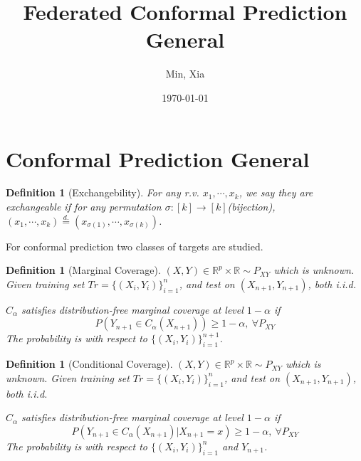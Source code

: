 \documentclass[12pt, a4paper, oneside]{article}
\title{\textbf{Federated Conformal Prediction General}}
\author{Min, Xia}
\date{\today}
\newtheorem{definition}[theorem]{Definition}
\begin{document}
\maketitle
\setcounter{page}{1}
\section[Section title sans citation]{Conformal Prediction General\cite{angelopoulos2023conformal}}
    \begin{definition}[Exchangebility]\cite{shafer2008tutorial}
        For any r.v. $x_1,\cdots,x_k$, we say they are exchangeable if for any permutation $\sigma:[k]\rightarrow[k]$(bijection), $(x_1,\cdots,x_k)\overset{d.}{=}(x_{\sigma(1)},\cdots,x_{\sigma(k)})$.
    \end{definition}


    For conformal prediction two classes of targets are studied.
    \begin{definition}[Marginal Coverage]
        $(X,Y)\in\mathbb{R}^p\times\mathbb{R}\sim P_{XY}$ which is unknown. Given training set $Tr=\{(X_i,Y_i)\}_{i=1}^n$, and test on $(X_{n+1},Y_{n+1})$, both i.i.d.


        $C_\alpha$  satisfies distribution-free marginal coverage at level $1-\alpha$ if
        \begin{equation*}
            P(Y_{n+1}\in C_\alpha(X_{n+1}))\geq 1-\alpha,\ \forall P_{XY}
        \end{equation*}
        The probability is with respect to $\{(X_i,Y_i)\}_{i=1}^{n+1}$.
    \end{definition}


    \begin{definition}[Conditional Coverage]
        $(X,Y)\in\mathbb{R}^p\times\mathbb{R}\sim P_{XY}$ which is unknown. Given training set $Tr=\{(X_i,Y_i)\}_{i=1}^n$, and test on $(X_{n+1},Y_{n+1})$, both i.i.d.


        $C_\alpha$  satisfies distribution-free marginal coverage at level $1-\alpha$ if
        \begin{equation*}
            P\left( Y_{n+1}\in C_\alpha(X_{n+1})\Big|X_{n+1}=x \right)\geq 1-\alpha,\ \forall P_{XY}
        \end{equation*}
        The probability is with respect to $\{(X_i,Y_i)\}_{i=1}^n$ and $Y_{n+1}$.
    \end{definition}
\end{document}
